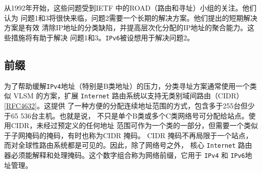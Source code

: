 从1992年开始，这些问题受到IETF 中的ROAD（路由和寻址）小组的关注。他们认为
问题1和3将很快来临，问题2需要一个长期的解决方案。他们提出的短期解决方案是有效
清除IP地址的分类缺陷，并提高层次化分配的IP地址的聚合能力。这些措施将有助于解决
问题1和3。\verb|IPv6|被设想用于解决问题2。

\subsection{前缀}
为了帮助缓解\verb|IPv4|地址（特别是B类地址）的压力，分类寻址方案通常使用一个类似
VLSM 的方案，扩展 \verb|Internet| 路由系统以支持无类别域间路由（CIDR）\href{https://www.rfc-editor.org/rfc/rfc4632}{[RFC4632]}。这提供
了一种方便的分配连续地址范围的方式，包含多于255台但少于65 536台主机。也就是说，
不只是单个B类或多个C类网络号可分配给站点。使用CIDR，未经过预定义的任何地址
范围可作为一个类的一部分，但需要一个类似于子网掩码的掩码，有时也称为CIDR 掩码。
CIDR 掩码不再局限于一个站点，而对全球性路由系统都是可见的。因此，除了网络号之外，
核心 \verb|Internet| 路由器必须能解释和处理掩码。这个数字组合称为网络前缀，它用于 \verb|IPv4| 和
\verb|IPv6|地址管理。


